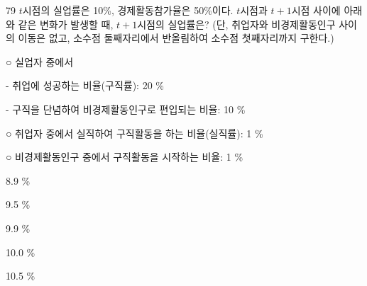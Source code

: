 \begin{question}{79}
$t$시점의 실업률은 10\%, 경제활동참가율은 50\%이다. $t$시점과 $t+1$시점 사이에 아래와 같은 변화가 발생할 때, $t+1$시점의 실업률은? (단, 취업자와 비경제활동인구 사이의 이동은 없고, 소수점 둘째자리에서 반올림하여 소수점 첫째자리까지 구한다.)
\begin{framedtext}
○ 실업자 중에서 \par
\hspace*{1em}- 취업에 성공하는 비율(구직률): 20 \% \par
\hspace*{1em}- 구직을 단념하여 비경제활동인구로 편입되는 비율: 10 \% \par
○ 취업자 중에서 실직하여 구직활동을 하는 비율(실직률): 1 \% \par
○ 비경제활동인구 중에서 구직활동을 시작하는 비율: 1 \% \par
\end{framedtext}
\begin{choices}
  \item 8.9 \%
  \item 9.5 \%
  \item 9.9 \%
  \item 10.0 \%
  \item 10.5 \%
\end{choices}
\end{question}
